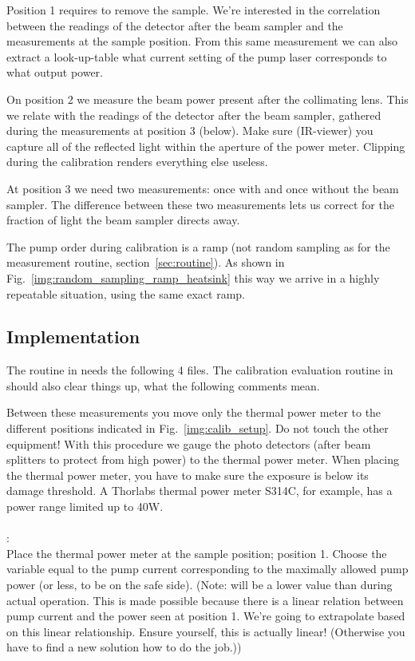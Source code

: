 Position 1 requires to remove the sample.
We're interested in the correlation between the readings
of the detector after the beam sampler
and the measurements at the sample position.
From this same measurement we can also extract
a look-up-table what current setting of the pump laser
corresponds to what output power.

On position 2 we measure the beam power present after the collimating lens.
This we relate with the readings of the detector after the beam sampler,
gathered during the measurements at position 3 (below).
Make sure (IR-viewer) you capture
all of the reflected light
within the aperture of the power meter.
Clipping during the calibration
renders everything else useless.

At position 3
we need two measurements:
once with and once without the beam sampler.
The difference between these two measurements
lets us correct for the fraction of light
the beam sampler directs away.

The pump order during calibration is a ramp
(not random sampling
as for the measurement routine,
section~\ref{sec:routine}).
As shown in Fig.~\ref{img:random_sampling_ramp_heatsink}
this way we arrive in a highly repeatable situation,
using the same exact ramp.

\subsection{Implementation}

The routine in 
needs the following 4 files.
The calibration evaluation routine
in 
should also clear things up,
what the following comments mean.

Between these measurements
you move only the thermal power meter
to the different positions indicated in Fig.~\ref{img:calib_setup}.
Do not touch the other equipment!
With this procedure
we gauge the photo detectors
(after beam splitters to protect from high power)
to the thermal power meter.
When placing the thermal power meter,
you have to make sure the exposure is below its damage threshold.
A Thorlabs thermal power meter S314C,
for example,
has a power range limited up to 40W.

\paragraph{}:\\
Place the thermal power meter at the sample position; position 1.
Choose the variable  equal to
the pump current corresponding to
the maximally allowed pump power
(or less, to be on the safe side).
(Note:  will be a lower value
than during actual operation.
This is made possible
because there is a linear relation
between pump current and the power seen at position 1.
We're going to extrapolate based on this linear relationship.
Ensure yourself, this is actually linear!
(Otherwise you have to find a new solution how to do the job.))


